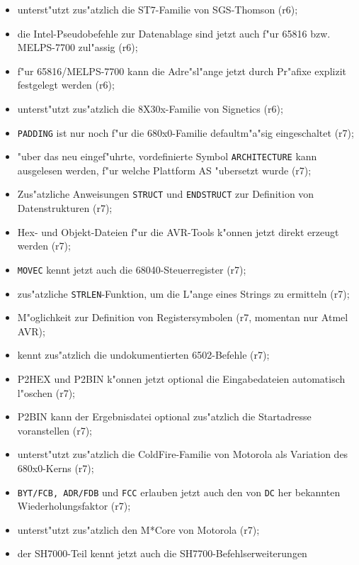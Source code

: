 \documentclass[12pt,a4paper,twoside]{report}
\newcommand{\tty}[1]{{\tt #1}}
\begin{document}
{\begin{itemize}
{\begin{itemize}
      \item{unterst"utzt zus"atzlich die ST7-Familie von SGS-Thomson (r6);}
      \item{die Intel-Pseudobefehle zur Datenablage sind jetzt
            auch f"ur 65816 bzw. MELPS-7700 zul"assig (r6);}
      \item{f"ur 65816/MELPS-7700 kann die Adre"sl"ange jetzt durch
            Pr"afixe explizit festgelegt werden (r6);}
      \item{unterst"utzt zus"atzlich die 8X30x-Familie von Signetics
            (r6);}
      \item{\tty{PADDING} ist nur noch f"ur die 680x0-Familie defaultm"a"sig
            eingeschaltet (r7);}
      \item{"uber das neu eingef"uhrte, vordefinierte Symbol
            \tty{ARCHITECTURE} kann ausgelesen werden, f"ur welche
            Plattform AS "ubersetzt wurde (r7);}
      \item{Zus"atzliche Anweisungen \tty{STRUCT} und \tty{ENDSTRUCT} zur
            Definition von Datenstrukturen (r7);}
      \item{Hex- und Objekt-Dateien f"ur die AVR-Tools k"onnen jetzt
            direkt erzeugt werden (r7);}
      \item{\tty{MOVEC} kennt jetzt auch die 68040-Steuerregister (r7);}
      \item{zus"atzliche \tty{STRLEN}-Funktion, um die L"ange eines
            Strings zu ermitteln (r7);}
      \item{M"oglichkeit zur Definition von Registersymbolen (r7, momentan
            nur Atmel AVR);}
      \item{kennt zus"atzlich die undokumentierten 6502-Befehle (r7);}
      \item{P2HEX und P2BIN k"onnen jetzt optional die Eingabedateien
            automatisch l"oschen (r7);}
      \item{P2BIN kann der Ergebnisdatei optional zus"atzlich die
            Startadresse voranstellen (r7);}
      \item{unterst"utzt zus"atzlich die ColdFire-Familie von Motorola als
            Variation des 680x0-Kerns (r7);}
      \item{\tty{BYT/FCB, ADR/FDB} und \tty{FCC} erlauben jetzt auch den
            von \tty{DC} her bekannten Wiederholungsfaktor (r7);}
      \item{unterst"utzt zus"atzlich den M*Core von Motorola (r7);}
      \item{der SH7000-Teil kennt jetzt auch die SH7700-Befehlserweiterungen
}
\end{itemize}}
\end{itemize}}
\end{document}
